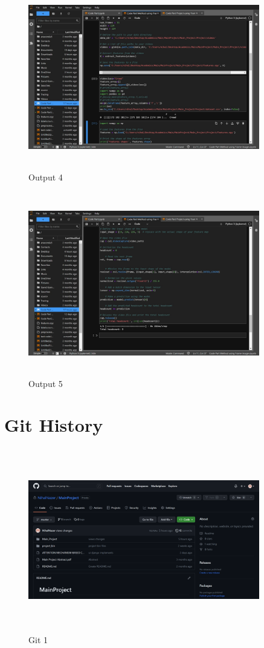 \documentclass[12pt]{report}
\begin{document}
\begin{figure}[htbp]
  \centering
  \includegraphics [width=0.9\textwidth, height=8cm]{9.jpeg}
  \caption{Output 4}
  \label{fig:image}
\end{figure}

\begin{figure}[htbp]
  \centering
  \includegraphics [width=0.9\textwidth, height=8cm]{10.jpeg}
  \caption{Output 5}
  \label{fig:image}
\end{figure}

\chapter{Git History}

\begin{figure}[htbp]
  \centering
  \includegraphics [width=0.9\textwidth, height=8cm]{git 1.png}
  \caption{Git 1}
  \label{fig:image}
\end{figure}
\end{document}
